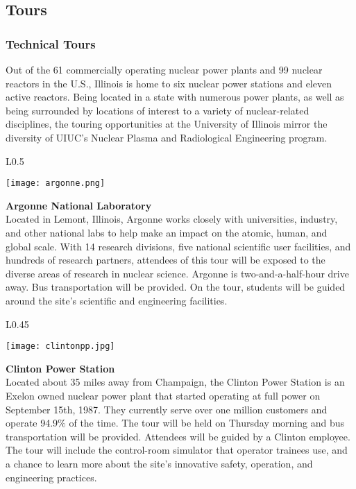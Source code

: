 \subsection{Tours}


\subsubsection{Technical Tours}
Out of the 61 commercially operating nuclear power plants and 99 nuclear reactors in the U.S., Illinois is home to six nuclear power stations and eleven active reactors. Being located in a state with numerous power plants, as well as being surrounded by locations of interest to a variety of nuclear-related disciplines, the touring opportunities at the University of Illinois mirror the diversity of UIUC’s Nuclear Plasma and Radiological Engineering program.\\

\setlength\intextsep{0pt}
\begin{wrapfigure}{L}{0.5\textwidth}
	\begin{center}
		\texttt{[image: argonne.png]}
	\end{center}
\end{wrapfigure}
\textbf{Argonne National Laboratory}\\
Located in Lemont, Illinois, Argonne works closely with universities, industry, and other national labs to help make an impact on the atomic, human, and global scale. With 14 research divisions, five national scientific user facilities, and hundreds of research partners, attendees of this tour will be exposed to the diverse areas of research in nuclear science. Argonne is two-and-a-half-hour drive away. Bus transportation will be provided. On the tour, students will be guided around the site’s scientific and engineering facilities.\\

\setlength\intextsep{0pt}
\begin{wrapfigure}{L}{0.45\textwidth}
	\begin{center}
		\texttt{[image: clintonpp.jpg]}
	\end{center}
\end{wrapfigure}
\textbf{Clinton Power Station}\\
Located about 35 miles away from Champaign, the Clinton Power Station is an Exelon owned nuclear power plant that started operating at full power on September 15th, 1987. They currently serve over one million customers and operate 94.9$\%$ of the time. The tour will be held on Thursday morning and bus transportation will be provided. Attendees will be guided by a Clinton employee. The tour will include the control-room simulator that operator trainees use, and a chance to learn more about the site’s innovative safety, operation, and engineering practices.\\

